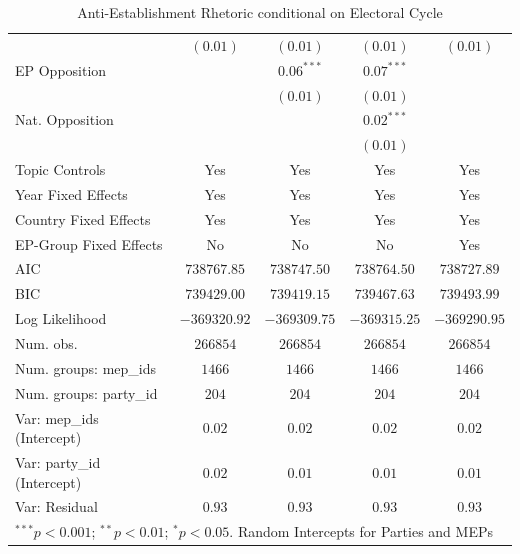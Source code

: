 \begin{table}
\begin{center}
\begin{tabular}{l c c c c}
                                                 & $(0.01)$     & $(0.01)$     & $(0.01)$     & $(0.01)$     \\
EP Opposition                                    &              & $0.06^{***}$ & $0.07^{***}$ &              \\
                                                 &              & $(0.01)$     & $(0.01)$     &              \\
Nat. Opposition                                  &              &              & $0.02^{***}$ &              \\
                                                 &              &              & $(0.01)$     &              \\
\midrule
Topic Controls                                   & Yes          & Yes          & Yes          & Yes          \\
Year Fixed Effects                               & Yes          & Yes          & Yes          & Yes          \\
Country Fixed Effects                            & Yes          & Yes          & Yes          & Yes          \\
EP-Group Fixed Effects                           & No           & No           & No           & Yes          \\
AIC                                              & $738767.85$  & $738747.50$  & $738764.50$  & $738727.89$  \\
BIC                                              & $739429.00$  & $739419.15$  & $739467.63$  & $739493.99$  \\
Log Likelihood                                   & $-369320.92$ & $-369309.75$ & $-369315.25$ & $-369290.95$ \\
Num. obs.                                        & $266854$     & $266854$     & $266854$     & $266854$     \\
Num. groups: mep\_ids                            & $1466$       & $1466$       & $1466$       & $1466$       \\
Num. groups: party\_id                           & $204$        & $204$        & $204$        & $204$        \\
Var: mep\_ids (Intercept)                        & $0.02$       & $0.02$       & $0.02$       & $0.02$       \\
Var: party\_id (Intercept)                       & $0.02$       & $0.01$       & $0.01$       & $0.01$       \\
Var: Residual                                    & $0.93$       & $0.93$       & $0.93$       & $0.93$       \\
\bottomrule
\multicolumn{5}{l}{\scriptsize{$^{***}p<0.001$; $^{**}p<0.01$; $^{*}p<0.05$. Random Intercepts for Parties and MEPs}}
\end{tabular}
\caption{Anti-Establishment Rhetoric conditional on Electoral Cycle}
\label{table:coefficients}
\end{center}
\end{table}
